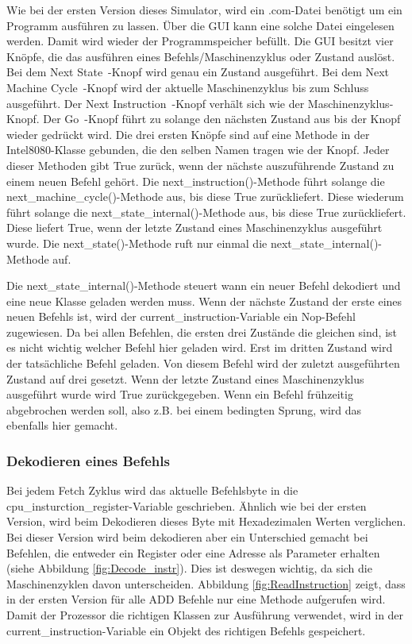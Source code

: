\documentclass[12pt]{article}
\begin{document}
Wie bei der ersten Version dieses Simulator, wird ein .com-Datei benötigt um ein Programm ausführen zu lassen. Über die GUI kann eine solche Datei eingelesen werden. Damit wird wieder der Programmspeicher befüllt.
Die GUI besitzt vier Knöpfe, die das ausführen eines Befehls/Maschinenzyklus oder Zustand auslöst. Bei dem \glqq Next State\grqq\ -Knopf wird genau ein Zustand ausgeführt. Bei dem \glqq Next Machine Cycle\grqq\ -Knopf wird der aktuelle Maschinenzyklus bis zum Schluss ausgeführt. Der  \glqq Next Instruction\grqq\ -Knopf verhält sich wie der Maschinenzyklus-Knopf. Der \glqq Go\grqq\ -Knopf führt zu solange den nächsten Zustand aus bis der Knopf wieder gedrückt wird. Die drei ersten Knöpfe sind auf eine Methode in der Intel8080-Klasse gebunden, die den selben Namen tragen wie der Knopf. Jeder dieser Methoden gibt True zurück, wenn der nächste auszuführende Zustand zu einem neuen Befehl gehört. 
Die next\_instruction()-Methode führt solange die next\_machine\_cycle()-Methode aus, bis diese True zurückliefert. Diese wiederum führt solange die next\_state\_internal()-Methode aus, bis diese True zurückliefert. Diese liefert True, wenn der letzte Zustand eines Maschinenzyklus ausgeführt wurde. Die next\_state()-Methode ruft nur einmal die next\_state\_internal()-Methode auf.

\noindent
Die next\_state\_internal()-Methode steuert wann ein neuer Befehl dekodiert und eine neue Klasse geladen werden muss. Wenn der nächste Zustand der erste eines neuen Befehls ist, wird der current\_instruction-Variable ein Nop-Befehl zugewiesen. Da bei allen Befehlen, die ersten drei Zustände die gleichen sind, ist es nicht wichtig welcher Befehl hier geladen wird. Erst im dritten Zustand wird der tatsächliche Befehl geladen. Von diesem Befehl wird der zuletzt ausgeführten Zustand auf drei gesetzt. Wenn der letzte Zustand eines Maschinenzyklus ausgeführt wurde wird True zurückgegeben. Wenn ein Befehl frühzeitig abgebrochen werden soll, also z.B. bei einem bedingten Sprung, wird das ebenfalls hier gemacht.

\subsubsection{Dekodieren eines Befehls}
Bei jedem Fetch Zyklus wird das aktuelle Befehlsbyte in die cpu\_insturction\_register-Variable geschrieben. Ähnlich wie bei der ersten Version, wird beim Dekodieren dieses Byte mit Hexadezimalen Werten verglichen. Bei dieser Version wird beim dekodieren aber ein Unterschied gemacht bei Befehlen, die entweder ein Register oder eine Adresse als Parameter erhalten (siehe Abbildung \ref{fig:Decode_instr}). Dies ist deswegen wichtig, da sich die Maschinenzyklen davon unterscheiden. Abbildung \ref{fig:ReadInstruction}  zeigt, dass in der ersten Version für alle ADD Befehle nur eine Methode aufgerufen wird. Damit der Prozessor die richtigen Klassen zur Ausführung verwendet, wird in der current\_instruction-Variable ein Objekt des richtigen Befehls gespeichert.
\end{document}
